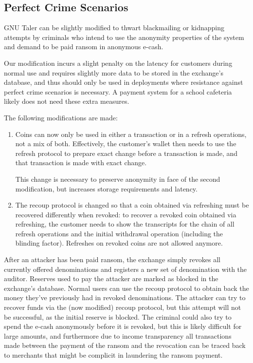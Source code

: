 \subsection{Perfect Crime Scenarios}\label{sec:design:blackmailing}
GNU Taler can be slightly modified to thwart blackmailing or kidnapping
attempts by criminals who intend to use the anonymity properties of the system
and demand to be paid ransom in anonymous e-cash.

Our modification incurs a slight penalty on the latency for customers during normal use and
requires slightly more data to be stored in the exchange's database, and thus
should only be used in deployments where resistance against perfect crime
scenarios is necessary.  A payment system for a school cafeteria likely does
not need these extra measures.

The following modifications are made:
\begin{enumerate}
  \item Coins can now only be used in either a transaction or in a refresh operations, not a mix of both.
    Effectively, the customer's wallet then needs to use the refresh protocol to prepare exact change
    before a transaction is made, and that transaction is made with exact change.

    This change is necessary to preserve anonymity in face of the second modification, but increases
    storage requirements and latency.
  \item The recoup protocol is changed so that a coin obtained
    via refreshing must be recovered differently when revoked: to recover a revoked coin
    obtained via refreshing, the customer needs to show the transcripts for the
    chain of all refresh operations and the initial withdrawal operation
    (including the blinding factor).  Refreshes on revoked coins are not
    allowed anymore.
\end{enumerate}

After an attacker has been paid ransom, the exchange simply revokes all currently offered denominations
and registers a new set of denomination with the auditor.
Reserves used to pay the attacker are marked as blocked in the exchange's
database.  Normal users can use the recoup protocol to obtain back the money
they've previously had in revoked denominations.  The attacker can try to
recover funds via the (now modified) recoup protocol, but this attempt will
not be successful, as the initial reserve is blocked.  The criminal could also
try to spend the e-cash anonymously before it is revoked, but this is likely
difficult for large amounts, and furthermore due to income transparency all
transactions made between the payment of the ransom and the revocation can be
traced back to merchants that might be complicit in laundering the ransom
payment.

